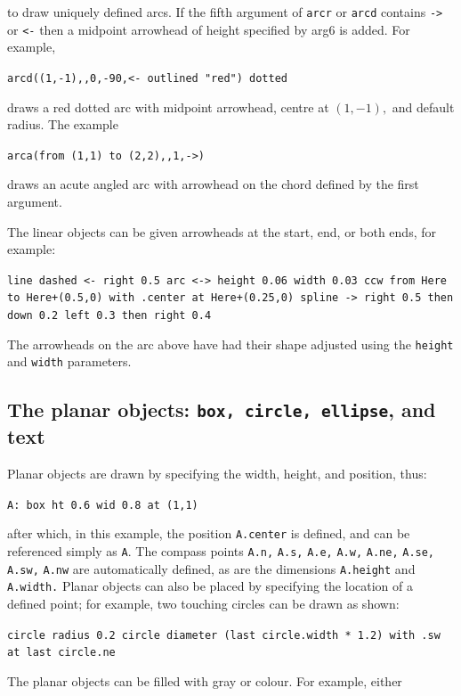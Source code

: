\noindent to draw uniquely defined arcs.
If the fifth argument of {\tt arcr} or {\tt arcd} contains {\tt ->} or {\tt <-}
then a midpoint arrowhead of height specified by arg6 is added.
For example,

{\tt arcd((1,-1),{},0,-90,<- outlined "red") dotted}

\noindent draws a red dotted arc with midpoint arrowhead,
 centre at $(1,-1),$ and default radius.
 The example

{\tt arca(from (1,1) to (2,2),{,}1,->)}

\noindent draws an acute angled arc with arrowhead on the chord defined by the
first argument.

The linear objects can be given arrowheads at the start, end, or both ends,
for example:

{\tt line dashed <- right 0.5\hfill\break
\hspace*{\parindent}%
arc <-> height 0.06 width 0.03 ccw from Here to Here+(0.5,0)
 \hfill\break
\hspace*{2\parindent}%
   with .center at Here+(0.25,0)\hfill\break
\hspace*{\parindent}%
spline -> right 0.5 then down 0.2 left 0.3 then right 0.4}

The arrowheads on the arc above have had their shape adjusted using the
{\tt height} and {\tt width} parameters.

\subsection{The planar objects: {\tt box, circle, ellipse}, and text%
\label{Planarobjects:}}
Planar objects are drawn by specifying the width, height, and position, thus:

{\tt A: box ht 0.6 wid 0.8 at (1,1)}

\noindent
after which, in this example, the position {\tt A.center} is defined,
and can be referenced simply as {\tt A}.
The compass points {\tt A.n,} {\tt A.s,} {\tt A.e,} {\tt A.w,} {\tt A.ne,}
{\tt A.se,} {\tt A.sw,} {\tt A.nw} are automatically defined, as are
the dimensions {\tt A.height} and {\tt A.width.}
Planar objects can also be placed by specifying the location of a defined
point; for example, two touching circles can be drawn as shown:

{\tt circle radius 0.2\hfill\break 
\hspace*{\parindent}%
circle diameter (last circle.width * 1.2) with .sw at last circle.ne}

The planar objects can be filled with gray or colour.
For example, either

